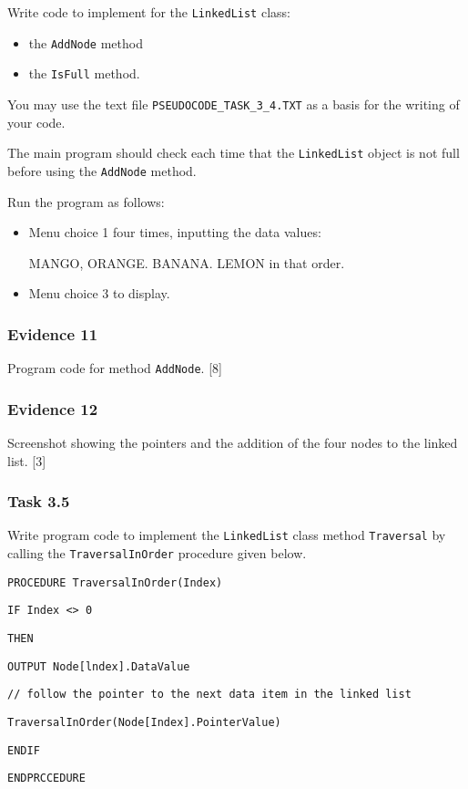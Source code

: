 Write code to implement for the \texttt{LinkedList} class: 
\begin{itemize}
\item the \texttt{AddNode} method 
\item the \texttt{IsFull} method. 
\end{itemize}
You may use the text file \texttt{PSEUDOCODE\_TASK\_3\_4.TXT} as a
basis for the writing of your code. 

The main program should check each time that the \texttt{LinkedList}
object is not full before using the \texttt{AddNode} method. 

Run the program as follows: 
\begin{itemize}
\item Menu choice 1 four times, inputting the data values: 

MANGO, ORANGE. BANANA. LEMON in that order. 
\item Menu choice 3 to display. 
\end{itemize}

\subsubsection*{Evidence 11}

Program code for method \texttt{AddNode}. \hfill{}{[}8{]}

\subsubsection*{Evidence 12}

Screenshot showing the pointers and the addition of the four nodes
to the linked list.\hfill{} {[}3{]}

\subsubsection*{Task 3.5}

Write program code to implement the \texttt{LinkedList} class method
\texttt{Traversal} by calling the \texttt{TraversalInOrder} procedure
given below. 

\noindent %
\noindent\begin{minipage}[t]{1\columnwidth}%
\texttt{PROCEDURE TraversalInOrder(Index)}

\texttt{\qquad{}IF Index <> 0}

\texttt{\qquad{}\qquad{}THEN}

\texttt{\qquad{}\qquad{}\qquad{}OUTPUT Node{[}lndex{]}.DataValue}

\texttt{\qquad{}\qquad{}\qquad{}// follow the pointer to the next
data item in the linked list}

\texttt{\qquad{}\qquad{}\qquad{}TraversalInOrder(Node{[}Index{]}.PointerValue)}

\texttt{\qquad{}ENDIF}

\texttt{ENDPRCCEDURE}%
\end{minipage}


